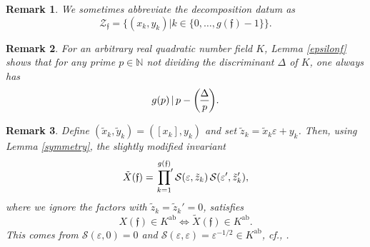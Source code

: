 \documentclass[11pt, a4paper]{amsart}
\newcommand{\ep}{\varepsilon}
\newcommand{\genlegendre}[4]{%
  \genfrac{(}{)}{}{#1}{#3}{#4}%
  \if\relax\detokenize{#2}\relax\else_{\!#2}\fi
}
\newcommand{\legendre}[3][]{\genlegendre{}{#1}{#2}{#3}}
\newcommand{\eq}[1]{\begin{equation}#1\end{equation}}
\theoremstyle{plain}
\newtheorem{remark}{Remark}[section]
\numberwithin{equation}{section}
\begin{document}
\begin{remark}
We sometimes abbreviate the decomposition datum as \eq{\mathcal Z_\mathfrak f = \{(x_k,y_k) | k\in \{0,\dots,g(\mathfrak f)-1\}\}.}
\end{remark}
 \begin{remark}
For an arbitrary real quadratic number field $K$, Lemma \ref{epsilonf} shows that for any prime $p \in \mathbb N$ not dividing the discriminant $\Delta$ of $K$, one always has \eq{g(p) \, \vert \, p-  \legendre{\Delta}{p}.}
\end{remark}
\begin{remark}
Define $(\tilde x _k, \tilde y _k) = ([x_k],y_k)$ and set $\tilde z_k = \tilde x _k \ep + y_k$. Then, using Lemma \ref{symmetry}, the slightly modified invariant \eq{\tilde X(\mathfrak f) = \sideset{}{'}\prod_{k=1}^{g(\mathfrak f)} \mathcal S(\ep,\tilde z _k) \, \mathcal S (\ep',\tilde z_k'),} where we ignore the factors with $\tilde z_k = \tilde z_k'=0$, satisfies 
\eq{X(\mathfrak f) \in K^{\mathrm{ab}} \Leftrightarrow \tilde X(\mathfrak f) \in K^{\mathrm{ab}} .}
This comes from $\mathcal S(\ep,0) = 0$ and $\mathcal S(\ep,\ep) = \ep^{-1/2} \in K^{\mathrm{ab}}$, cf., \cite{yamamoto2008kronecker}.
\end{remark}
\end{document}
